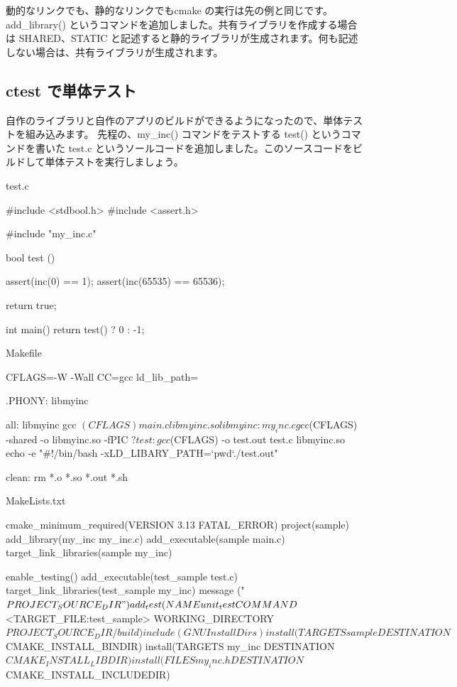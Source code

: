 \documentclass[mingoth,a4paper]{jsarticle}
\begin{document}
動的なリンクでも、静的なリンクでもcmake の実行は先の例と同じです。
add\_library() というコマンドを追加しました。共有ライブラリを作成する場合は SHARED、STATIC と記述すると静的ライブラリが生成されます。何も記述しない場合は、共有ライブラリが生成されます。

\clearpage

\subsection{ctest で単体テスト}

自作のライブラリと自作のアプリのビルドができるようになったので、単体テストを組み込みます。
先程の、my\_inc() コマンドをテストする test() というコマンドを書いた test.c というソールコードを追加しました。このソースコードをビルドして単体テストを実行しましょう。

\vspace{1em}
test.c
\begin{commandline}
#include <stdbool.h>
#include <assert.h>

#include "my_inc.c"

bool test ()
{
    assert(inc(0) == 1);
    assert(inc(65535) == 65536);

    return true;
}

int main(){
    return test() ? 0 : -1;
}
\end{commandline}

\vspace{1em}
Makefile
\begin{commandline}
CFLAGS=-W -Wall
CC=gcc
ld_lib_path=

.PHONY: libmyinc

all: libmyinc
	gcc $(CFLAGS) main.c libmyinc.so

libmyinc: my_inc.c
	gcc $(CFLAGS) -shared -o libmyinc.so -fPIC $?

test:
	gcc $(CFLAGS) -o test.out test.c libmyinc.so
	echo -e "#!/bin/bash -x\nexport LD_LIBARY_PATH=`pwd`\n./test.out"

clean:
	rm *.o *.so *.out *.sh
\end{commandline}

\vspace{1em}
MakeLists.txt
\begin{commandline}
cmake_minimum_required(VERSION 3.13 FATAL_ERROR) 
project(sample)
add_library(my_inc my_inc.c)
add_executable(sample main.c)
target_link_libraries(sample my_inc)

enable_testing()
add_executable(test_sample test.c)
target_link_libraries(test_sample my_inc)
message ("${PROJECT_SOURCE_DIR}")
add_test(NAME unit_test COMMAND $<TARGET_FILE:test_sample> WORKING_DIRECTORY ${PROJECT_SOURCE_DIR}/build)

include(GNUInstallDirs)
install(TARGETS sample DESTINATION ${CMAKE_INSTALL_BINDIR})
install(TARGETS my_inc DESTINATION ${CMAKE_INSTALL_LIBDIR})
install(FILES my_inc.h DESTINATION ${CMAKE_INSTALL_INCLUDEDIR})

\end{commandline}
\end{document}
